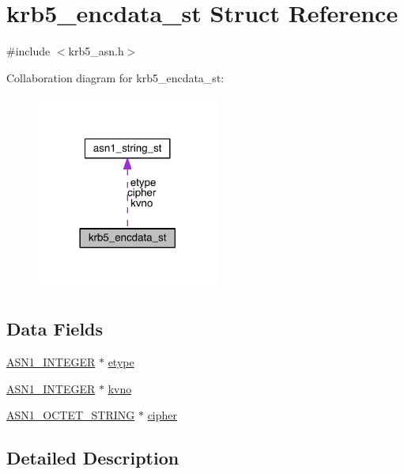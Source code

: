 \hypertarget{structkrb5__encdata__st}{}\section{krb5\+\_\+encdata\+\_\+st Struct Reference}
\label{structkrb5__encdata__st}


{\ttfamily \#include $<$krb5\+\_\+asn.\+h$>$}



Collaboration diagram for krb5\+\_\+encdata\+\_\+st\+:\nopagebreak
\begin{figure}[H]
\begin{center}
\leavevmode
\includegraphics[width=170pt]{structkrb5__encdata__st__coll__graph}
\end{center}
\end{figure}
\subsection*{Data Fields}
\begin{DoxyCompactItemize}
\item 
\hyperlink{crypto_2ossl__typ_8h_af4335399bf9774cb410a5e93de65998b}{A\+S\+N1\+\_\+\+I\+N\+T\+E\+G\+ER} $\ast$ \hyperlink{structkrb5__encdata__st_aa0ea3aeaf8a055ae706b6e1b04c01090}{etype}
\item 
\hyperlink{crypto_2ossl__typ_8h_af4335399bf9774cb410a5e93de65998b}{A\+S\+N1\+\_\+\+I\+N\+T\+E\+G\+ER} $\ast$ \hyperlink{structkrb5__encdata__st_a9720d744a912d1dd4824965ecb0c1d7f}{kvno}
\item 
\hyperlink{crypto_2ossl__typ_8h_afbd05e94e0f0430a2b729473efec88c1}{A\+S\+N1\+\_\+\+O\+C\+T\+E\+T\+\_\+\+S\+T\+R\+I\+NG} $\ast$ \hyperlink{structkrb5__encdata__st_a424a5bfa2d8b18fef58fcf4ae7c56a28}{cipher}
\end{DoxyCompactItemize}


\subsection{Detailed Description}


